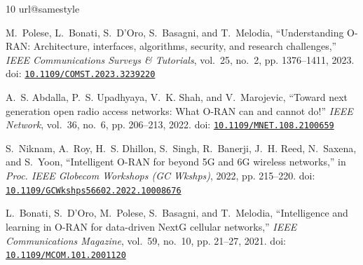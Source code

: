 \begin{thebibliography}{10}
\providecommand{\url}[1]{#1}
\csname url@samestyle\endcsname
\providecommand{\newblock}{\relax}
\providecommand{\bibinfo}[2]{#2}
\providecommand{\BIBentrySTDinterwordspacing}{\spaceskip=0pt\relax}
\providecommand{\BIBentryALTinterwordstretchfactor}{4}
\providecommand{\BIBentryALTinterwordspacing}{\spaceskip=\fontdimen2\font plus
\BIBentryALTinterwordstretchfactor\fontdimen3\font minus
  \fontdimen4\font\relax}
\providecommand{\BIBforeignlanguage}[2]{{%
\expandafter\ifx\csname l@#1\endcsname\relax
\typeout{** WARNING: IEEEtran.bst: No hyphenation pattern has been}%
\typeout{** loaded for the language `#1'. Using the pattern for}%
\typeout{** the default language instead.}%
\else
\language=\csname l@#1\endcsname
\fi
#2}}
\providecommand{\BIBdecl}{\relax}
\BIBdecl

M.~Polese, L.~Bonati, S.~D'Oro, S.~Basagni, and T.~Melodia, ``Understanding
  {O-RAN}: Architecture, interfaces, algorithms, security, and research
  challenges,'' \emph{IEEE Communications Surveys \& Tutorials}, vol.~25,
  no.~2, pp. 1376--1411, 2023. doi:
  \href{https://doi.org/10.1109/COMST.2023.3239220}{\nolinkurl{10.1109/COMST.2023.3239220}}

A.~S. Abdalla, P.~S. Upadhyaya, V.~K. Shah, and V.~Marojevic, ``Toward next
  generation open radio access networks: What {O-RAN} can and cannot do!''
  \emph{IEEE Network}, vol.~36, no.~6, pp. 206--213, 2022. doi:
  \href{https://doi.org/10.1109/MNET.108.2100659}{\nolinkurl{10.1109/MNET.108.2100659}}

S.~Niknam, A.~Roy, H.~S. Dhillon, S.~Singh, R.~Banerji, J.~H. Reed, N.~Saxena,
  and S.~Yoon, ``Intelligent {O-RAN} for beyond {5G} and {6G} wireless
  networks,'' in \emph{Proc. IEEE Globecom Workshops (GC Wkshps)}, 2022, pp.
  215--220. doi:
  \href{https://doi.org/10.1109/GCWkshps56602.2022.10008676}{\nolinkurl{10.1109/GCWkshps56602.2022.10008676}}

L.~Bonati, S.~D'Oro, M.~Polese, S.~Basagni, and T.~Melodia, ``Intelligence and
  learning in {O-RAN} for data-driven {NextG} cellular networks,'' \emph{IEEE
  Communications Magazine}, vol.~59, no.~10, pp. 21--27, 2021. doi:
  \href{https://doi.org/10.1109/MCOM.101.2001120}{\nolinkurl{10.1109/MCOM.101.2001120}}


\end{thebibliography}
